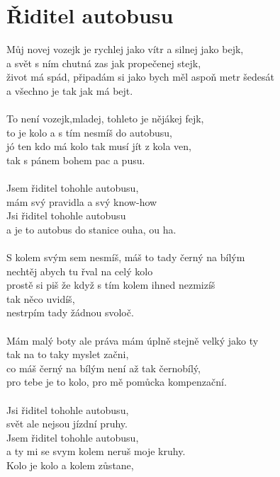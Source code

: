 \section{Řiditel autobusu}
Můj novej vozejk je rychlej jako vítr a silnej jako bejk,\\
a svět s ním chutná zas jak propečenej stejk,\\
život má spád, připadám si jako bych měl aspoň metr šedesát\\
a všechno je tak jak má bejt.\\
\\
To není vozejk,mladej, tohleto je nějákej fejk,\\
to je kolo a s tím nesmíš do autobusu,\\
jó ten kdo má kolo tak musí jít z kola ven,\\
tak s pánem bohem pac a pusu.\\
\\
Jsem řiditel tohohle autobusu,\\
mám svý pravidla a svý know-how \\
Jsi řiditel tohohle autobusu\\
a je to autobus do stanice ouha, ou ha.\\
\\
S kolem svým sem nesmíš, máš to tady černý na bílým\\
nechtěj abych tu řval na celý kolo\\
prostě si piš že když s tím kolem ihned nezmizíš\\
tak něco uvidíš,\\
nestrpím tady žádnou svoloč.\\
\\
Mám malý boty ale práva mám úplně stejně velký jako ty\\
tak na to taky myslet začni,\\
co máš černý na bílým není až tak černobílý,\\
pro tebe je to kolo, pro mě pomůcka kompenzační.\\
\\
Jsi řiditel tohohle autobusu,\\
svět ale nejsou jízdní pruhy.\\
Jsem řiditel tohohle autobusu,\\
a ty mi se svym kolem neruš moje kruhy.\\
\newpage
{}Kolo je kolo a kolem zůstane,\\
